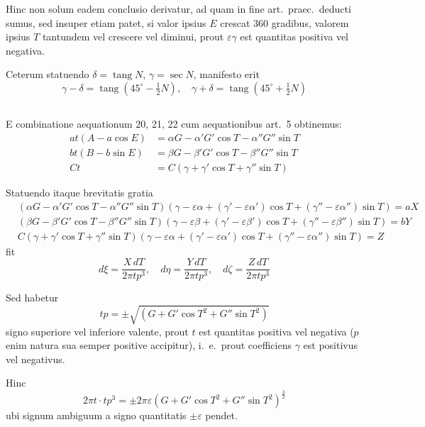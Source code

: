 \documentclass[12pt,a4paper]{article}
\DeclareMathOperator{\tang}{tang}
\begin{document}
Hinc non solum eadem conclusio derivatur, ad quam in fine art.\ praec.\ deducti sumus, sed insuper etiam patet, si valor ipsius $E$ crescat $360$ gradibus, valorem ipsius $T$ tantundem vel crescere vel diminui, prout $\varepsilon\gamma$ est quantitas positiva vel negativa.

Ceterum statuendo $\delta = \tang N$, $\gamma = \sec N$, manifesto erit
\[
\gamma - \delta = \tang(45^{\circ} - \tfrac{1}{2}N), \quad \gamma + \delta = \tang(45^{\circ} + \tfrac{1}{2}N)
\]

\setcounter{subsection}{13}
\subsection{}

E combinatione aequationum 20, 21, 22 cum aequationibus art.~5 obtinemus:
\[
\begin{aligned}
at(A - a\cos E) &= \alpha G - \alpha' G'\cos T - \alpha'' G''\sin T \\
bt(B - b\sin E) &= \beta G - \beta' G'\cos T - \beta'' G''\sin T \\
Ct &= C(\gamma + \gamma'\cos T + \gamma''\sin T)
\end{aligned}
\]

Statuendo itaque brevitatis gratia
\[
\begin{aligned}
&(\alpha G - \alpha' G'\cos T - \alpha'' G''\sin T)(\gamma - \varepsilon\alpha + (\gamma' - \varepsilon\alpha')\cos T + (\gamma'' - \varepsilon\alpha'')\sin T) = aX \\
&(\beta G - \beta' G'\cos T - \beta'' G''\sin T)(\gamma - \varepsilon\beta + (\gamma' - \varepsilon\beta')\cos T + (\gamma'' - \varepsilon\beta'')\sin T) = bY \\
&C(\gamma + \gamma'\cos T + \gamma''\sin T)(\gamma - \varepsilon\alpha + (\gamma' - \varepsilon\alpha')\cos T + (\gamma'' - \varepsilon\alpha'')\sin T) = Z
\end{aligned}
\]
fit
\[
d\xi = \frac{X\,dT}{2\pi tp^3}, \quad d\eta = \frac{Y\,dT}{2\pi tp^3}, \quad d\zeta = \frac{Z\,dT}{2\pi tp^3}
\]

Sed habetur
\[
tp = \pm\sqrt{(G + G'\cos T^2 + G''\sin T^2)}
\]
signo superiore vel inferiore valente, prout $t$ est quantitas positiva vel negativa ($p$ enim natura sua semper positive accipitur), i.~e.\ prout coefficiens $\gamma$ est positivus vel negativus.

Hinc
\[
2\pi t\cdot tp^3 = \pm 2\pi\varepsilon(G + G'\cos T^2 + G''\sin T^2)^{\frac{3}{2}}
\]
ubi signum ambiguum a signo quantitatis $\pm\varepsilon$ pendet.
\end{document}
